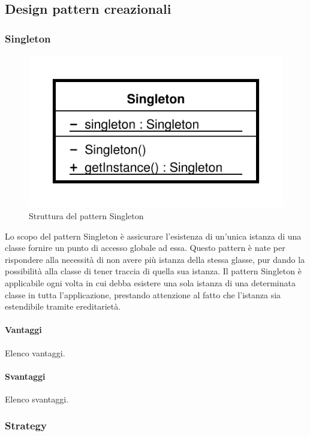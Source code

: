 \documentclass[../SpecificaTecnica.tex]{subfiles}
\begin{document}
	\subsection{Design pattern creazionali}
		\subsubsection{Singleton}
			\begin{figure}[!h]
				\centering
				\includegraphics[scale=0.5]{pattern/singleton}
				\caption{Struttura del pattern Singleton}
				\label{fig:Struttura_Singleton}
			\end{figure}
			
			Lo scopo del pattern Singleton è assicurare l'esistenza di un'unica istanza di una classe fornire un punto di accesso globale ad essa. Questo pattern è nate per rispondere alla necessità di non avere più istanza della stessa glasse, pur dando la possibilità alla classe di tener traccia di quella sua istanza. Il pattern Singleton è applicabile ogni volta in cui debba esistere una sola istanza di una determinata classe in tutta l'applicazione, prestando attenzione al fatto che l'istanza sia estendibile tramite ereditarietà.
			\paragraph{Vantaggi}
				Elenco vantaggi.
			\paragraph{Svantaggi}
				Elenco svantaggi.
		\subsubsection{Strategy}
		
\end{document}
